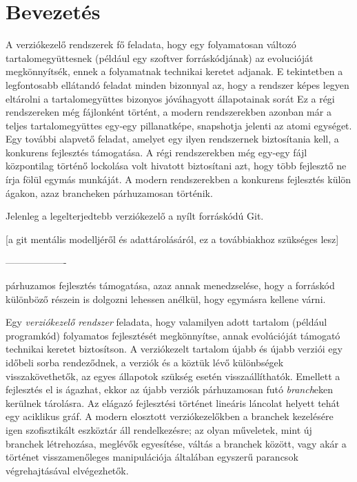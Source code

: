 \documentclass[final]{elteikthesis}[2025/03/25]
\begin{document}
\tableofcontents
\cleardoublepage

\chapter{Bevezetés}

A verziókezelő rendszerek fő feladata,
hogy egy folyamatosan változó tartalomegyüttesnek (például egy szoftver forráskódjának)
az evolucióját megkönnyítsék, ennek a folyamatnak technikai keretet adjanak.
E tekintetben a legfontosabb ellátandó feladat minden bizonnyal az,
hogy a rendszer képes legyen eltárolni a tartalomegyüttes bizonyos jóváhagyott állapotainak sorát
Ez a régi rendszereken még fájlonként történt,
a modern rendszerekben azonban már a teljes tartalomegyüttes
egy-egy pillanatképe, snapshotja jelenti az atomi egységet.
Egy további alapvető feladat, amelyet egy ilyen rendszernek biztosítania kell, a konkurens fejlesztés támogatása.
A régi rendszerekben még egy-egy fájl központilag történő lockolása volt hivatott biztosítani azt,
hogy több fejlesztő ne írja fölül egymás munkáját.
A modern rendszerekben a konkurens fejlesztés külön ágakon, azaz brancheken párhuzamosan történik.

Jelenleg a legelterjedtebb verziókezelő a nyílt forráskódú Git.

[a git mentális modelljéről és adattárolásáról, ez a továbbiakhoz szükséges lesz]

-------------------

párhuzamos fejlesztés támogatása,
azaz annak menedzselése, hogy a forráskód különböző részein is dolgozni lehessen anélkül,
hogy egymásra kellene várni.


Egy \textit{verziókezelő rendszer} feladata, hogy valamilyen adott tartalom (például programkód)
folyamatos fejlesztését megkönnyítse, annak evolúcióját támogató technikai keretet biztosítson.
A verziókezelt tartalom újabb és újabb verziói egy időbeli sorba rendeződnek,
a verziók és a köztük lévő különbségek visszakövethetők,
az egyes állapotok szükség esetén visszaállíthatók.
Emellett a fejlesztés el is ágazhat,
ekkor az újabb verziók párhuzamosan futó \textit{branch}eken kerülnek tárolásra.
Az elágazó fejlesztési történet lineáris láncolat helyett tehát egy aciklikus gráf. 
A modern elosztott verziókezelőkben a branchek kezelésére igen szofisztikált eszköztár áll rendelkezésre;
az olyan műveletek, mint új branchek létrehozása, meglévők egyesítése,
váltás a branchek között,
vagy akár a történet visszamenőleges manipulációja
általában egyszerű parancsok végrehajtásával elvégezhetők.
\end{document}
